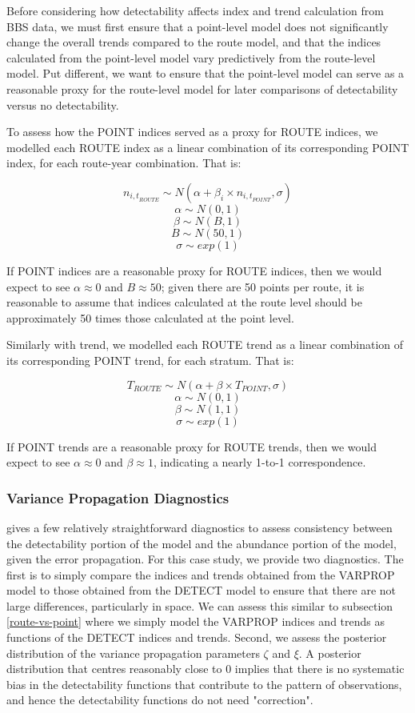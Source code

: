 \documentclass[12pt]{article}
\begin{document}
\par Before considering how detectability affects index and trend calculation from BBS data, we must first ensure that a point-level model does not significantly change the overall trends compared to the route model, and that the indices calculated from the point-level model vary predictively from the route-level model.
Put different, we want to ensure that the point-level model can serve as a reasonable proxy for the route-level model for later comparisons of detectability versus no detectability.

\par To assess how the POINT indices served as a proxy for ROUTE indices, we modelled each ROUTE index as a linear combination of its corresponding POINT index, for each route-year combination. 
That is:

$$	n_{{i,t}_{ROUTE}} \sim N(\alpha + \beta_i \times n_{{i,t}_{POINT}}, \sigma) $$
$$	\alpha \sim N(0,1) $$
$$	\beta \sim N(B, 1) $$
$$	B \sim N(50, 1) $$
$$	\sigma \sim exp(1)$$

If POINT indices are a reasonable proxy for ROUTE indices, then we would expect to see $\alpha \approx 0$ and $B \approx 50$; given there are 50 points per route, it is reasonable to assume that indices calculated at the route level should be approximately 50 times those calculated at the point level.

\par Similarly with trend, we modelled each ROUTE trend as a linear combination of its corresponding POINT trend, for each stratum.
That is:

$$ T_{ROUTE} \sim N(\alpha + \beta \times T_{POINT}, \sigma)$$
$$ \alpha \sim N(0,1) $$
$$ \beta \sim N(1,1) $$
$$ \sigma \sim exp(1) $$

If POINT trends are a reasonable proxy for ROUTE trends, then we would expect to see $\alpha \approx 0$ and $\beta \approx 1$, indicating a nearly 1-to-1 correspondence. 

\subsubsection{Variance Propagation Diagnostics}

\par \citet{bravington_variance_2021} gives a few relatively straightforward diagnostics to assess consistency between the detectability portion of the model and the abundance portion of the model, given the error propagation.
For this case study, we provide two diagnostics.
The first is to simply compare the indices and trends obtained from the VARPROP model to those obtained from the DETECT model to ensure that there are not large differences, particularly in space. 
We can assess this similar to subsection \ref{route-vs-point} where we simply model the VARPROP indices and trends as functions of the DETECT indices and trends.
Second, we assess the posterior distribution of the variance propagation parameters $\zeta$ and $\xi$.
A posterior distribution that centres reasonably close to 0 implies that there is no systematic bias in the detectability functions that contribute to the pattern of observations, and hence the detectability functions do not need "correction".
\end{document}
